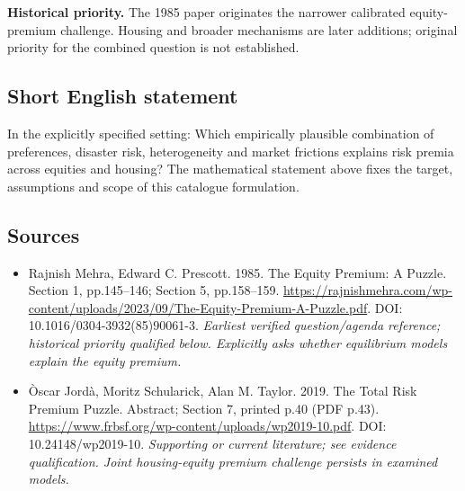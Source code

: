 \documentclass[11pt]{article}
\begin{document}
\par\textbf{Historical priority.} The 1985 paper originates the narrower calibrated equity-premium challenge. Housing and broader mechanisms are later additions; original priority for the combined question is not established.

\subsection{Short English statement}
In the explicitly specified setting: Which empirically plausible combination of preferences, disaster risk, heterogeneity and market frictions explains risk premia across equities and housing? The mathematical statement above fixes the target, assumptions and scope of this catalogue formulation.

\subsection{Sources}
\begin{itemize}\raggedright
\item[\textnormal{[S1]}]\hypertarget{source:30007592:1}{} Rajnish Mehra, Edward C. Prescott. 1985. The Equity Premium: A Puzzle. Section 1, pp.145–146; Section 5, pp.158–159.
\url{https://rajnishmehra.com/wp-content/uploads/2023/09/The-Equity-Premium-A-Puzzle.pdf}.
DOI: 10.1016/0304-3932(85)90061-3.
{\small\textit{Earliest verified question/agenda reference; historical priority qualified below. Explicitly asks whether equilibrium models explain the equity premium.}}

\item[\textnormal{[S2]}]\hypertarget{source:30007592:2}{} Òscar Jordà, Moritz Schularick, Alan M. Taylor. 2019. The Total Risk Premium Puzzle. Abstract; Section 7, printed p.40 (PDF p.43).
\url{https://www.frbsf.org/wp-content/uploads/wp2019-10.pdf}.
DOI: 10.24148/wp2019-10.
{\small\textit{Supporting or current literature; see evidence qualification. Joint housing-equity premium challenge persists in examined models.}}
\end{itemize}
\end{document}
